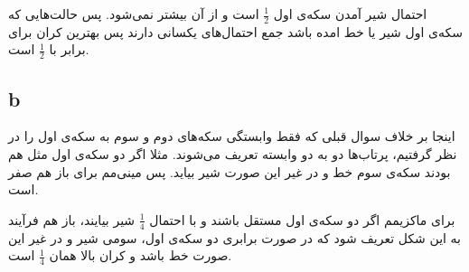 \documentclass{article}
\begin{document}
احتمال شیر آمدن سکه‌ی اول
$\frac{1}{2}$
است و از آن بیشتر نمی‌شود. پس حالت‌هایی که سکه‌ی اول شیر یا خط امده باشد جمع احتمال‌های یکسانی دارند پس بهترین کران برای
برابر با 
$\frac{1}{2}$
است.

\subsection*{b}
اینجا بر خلاف سوال قبلی که فقط وابستگی سکه‌های دوم و سوم به سکه‌ی اول را در نظر گرفتیم، پرتاب‌ها دو به دو وابسته تعریف می‌شوند. مثلا اگر دو سکه‌ی اول مثل هم بودند سکه‌ی سوم خط و در غیر این صورت شیر بیاید. پس مینی‌مم برای
باز هم صفر است.

برای ماکزیمم اگر دو سکه‌ی اول مستقل باشند و با احتمال
$\frac{1}{4}$
شیر بیایند، باز هم فرآیند به این شکل تعریف شود که در صورت برابری دو سکه‌ی اول، سومی شیر و در غیر این صورت خط باشد و کران بالا همان
$\frac{1}{4}$
است.
\end{document}
